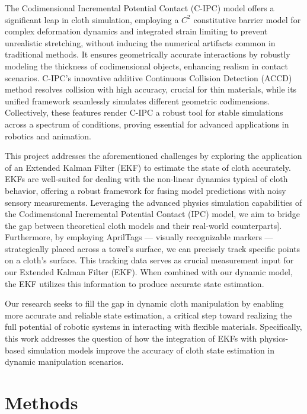 \documentclass[subscriptcorrection,upint,varvw,barcolor=Goldenrod3,mathalfa=cal=euler,balance,hyphenate,french,pdf-a, nofoot]{asmejour} %
\begin{document}
The Codimensional Incremental Potential Contact (C-IPC) model offers a significant leap in cloth simulation, employing a $C^2$ constitutive barrier model for complex deformation dynamics and integrated strain limiting to prevent unrealistic stretching, without inducing the numerical artifacts common in traditional methods\cite{Li2020IPC, Li2021CIPC}. It ensures geometrically accurate interactions by robustly modeling the thickness of codimensional objects, enhancing realism in contact scenarios. C-IPC's innovative additive Continuous Collision Detection (ACCD) method resolves collision with high accuracy, crucial for thin materials, while its unified framework seamlessly simulates different geometric codimensions. Collectively, these features render C-IPC a robust tool for stable simulations across a spectrum of conditions, proving essential for advanced applications in robotics and animation.

This project addresses the aforementioned challenges by exploring the application of an Extended Kalman Filter (EKF) to estimate the state of cloth accurately. EKFs are well-suited for dealing with the non-linear dynamics typical of cloth behavior, offering a robust framework for fusing model predictions with noisy sensory measurements. Leveraging the advanced physics simulation capabilities of the Codimensional Incremental Potential Contact (IPC) model, we aim to bridge the gap between theoretical cloth models and their real-world counterparts]. Furthermore, by employing AprilTags — visually recognizable markers — strategically placed across a towel's surface, we can precisely track specific points on a cloth's surface. This tracking data serves as crucial measurement input for our Extended Kalman Filter (EKF). When combined with our dynamic model, the EKF utilizes this information to produce accurate state estimation.

Our research seeks to fill the gap in dynamic cloth manipulation by enabling more accurate and reliable state estimation, a critical step toward realizing the full potential of robotic systems in interacting with flexible materials. Specifically, this work addresses the question of how the integration of EKFs with physics-based simulation models improve the accuracy of cloth state estimation in dynamic manipulation scenarios.


 



\section{Methods}
\end{document}
